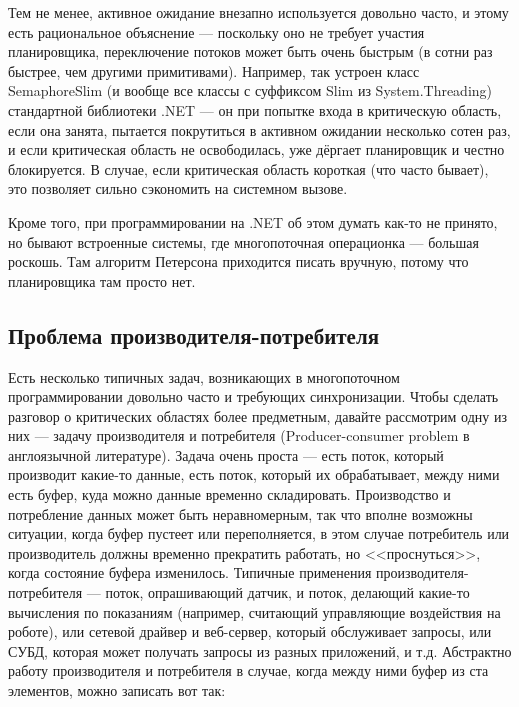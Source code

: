 \documentclass{../../text-style}
\begin{document}
Тем не менее, активное ожидание внезапно используется довольно часто, и этому есть рациональное объяснение --- поскольку оно не требует участия планировщика, переключение потоков может быть очень быстрым (в сотни раз быстрее, чем другими примитивами). Например, так устроен класс SemaphoreSlim (и вообще все классы с суффиксом Slim из System.Threading) стандартной библиотеки .NET --- он при попытке входа в критическую область, если она занята, пытается покрутиться в активном ожидании несколько сотен раз, и если критическая область не освободилась, уже дёргает планировщик и честно блокируется. В случае, если критическая область короткая (что часто бывает), это позволяет сильно сэкономить на системном вызове.

Кроме того, при программировании на .NET об этом думать как-то не принято, но бывают встроенные системы, где многопоточная операционка --- большая роскошь. Там алгоритм Петерсона приходится писать вручную, потому что планировщика там просто нет.

\subsection{Проблема производителя-потребителя}

Есть несколько типичных задач, возникающих в многопоточном программировании довольно часто и требующих синхронизации. Чтобы сделать разговор о критических областях более предметным, давайте рассмотрим одну из них --- задачу производителя и потребителя (Producer-consumer problem в англоязычной литературе). Задача очень проста --- есть поток, который производит какие-то данные, есть поток, который их обрабатывает, между ними есть буфер, куда можно данные временно складировать. Производство и потребление данных может быть неравномерным, так что вполне возможны ситуации, когда буфер пустеет или переполняется, в этом случае потребитель или производитель должны временно прекратить работать, но <<проснуться>>, когда состояние буфера изменилось. Типичные применения производителя-потребителя --- поток, опрашивающий датчик, и поток, делающий какие-то вычисления по показаниям (например, считающий управляющие воздействия на роботе), или сетевой драйвер и веб-сервер, который обслуживает запросы, или СУБД, которая может получать запросы из разных приложений, и т.д. Абстрактно работу производителя и потребителя в случае, когда между ними буфер из ста элементов, можно записать вот так:
\end{document}

